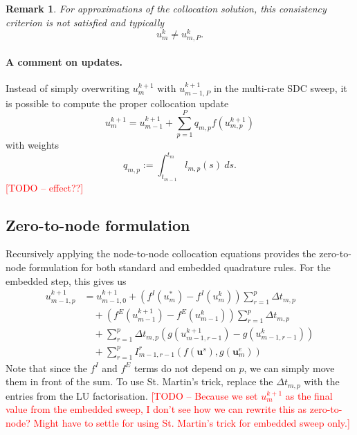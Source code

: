 \documentclass{article}
\newtheorem{remark}{Remark}
\newcommand{\ve}[1]{\mathbf{#1}}
\newcommand{\todo}[1]{\textcolor{red}{[TODO -- #1]}}
\begin{document}
%
%
\begin{remark}
For approximations of the collocation solution, this consistency criterion is not satisfied and typically
\begin{equation}
	u_{m}^{k} \neq u_{m,P}^{k}.
\end{equation}
\end{remark}

\paragraph{A comment on updates.}
Instead of simply overwriting $u^{k+1}_{m}$ with $u^{k+1}_{m-1,P}$ in the multi-rate SDC sweep, it is possible to compute the proper collocation update
\begin{equation}
	u^{k+1}_{m} = u^{k+1}_{m-1} + \sum_{p=1}^{P} q_{m, p} f(u^{k+1}_{m,p})
\end{equation}
with weights
\begin{equation}
	q_{m,p} := \int_{t_{m-1}}^{t_{m}} l_{m,p}(s)~ds.
\end{equation}
\todo{effect??}

\subsection*{Zero-to-node formulation}
Recursively applying the node-to-node collocation equations provides the zero-to-node formulation for both standard and embedded quadrature rules.
For the embedded step, this gives us
\begin{subequations}
\begin{align}
	u^{k+1}_{m-1,p} &= u^{k+1}_{m-1,0} + \left( f^{I}(u^{*}_{m}) - f^{I}(u^k_m)  \right)  \sum_{r=1}^{p} \Delta t_{m,p} \\
				& \quad +  \left( f^{E}(u^{k+1}_{m-1}) - f^{E}(u^k_{m-1}) \right) \sum_{r=1}^{p} \Delta t_{m,p} \\
				& \quad + \sum_{r=1}^{p} \Delta t_{m,p} \left( g(u^{k+1}_{m-1,r-1}) - g(u^k_{m-1,r-1}) \right) \\
				& \quad + \sum_{r=1}^{p} I_{m-1,r-1}^{r}\left( f(\ve{u}^{s}) , g(\ve{u}^{e}_m) \right)
\end{align}
\end{subequations}
Note that since the $f^I$ and $f^E$ terms do not depend on $p$, we can simply move them in front of the sum.
To use St. Martin's trick, replace the $\Delta t_{m,p}$ with the entries from the LU factorisation.
\todo{Because we set $u^{k+1}_m$ as the final value from the embedded sweep, I don't see how we can rewrite this as zero-to-node? Might have to settle for using St. Martin's trick for embedded sweep only.}
\end{document}
